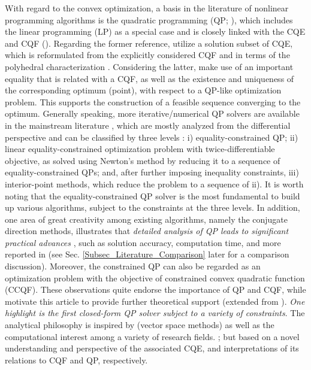 \documentclass{imaman}
\numberwithin{equation}{section}
\begin{document}
With regard to the convex optimization, a basis in the literature of nonlinear programming algorithms is the quadratic programming (QP; \cite{LiTsWo:20,Lu(Ye):03(16)}), which includes the linear programming (LP) as a special case and is closely linked with the CQE and CQF (\cite{PaSa:10,RaBoJoVeJo:08}). Regarding the former reference, \cite{PaSa:10} utilize a solution subset of CQE, which is reformulated from the explicitly considered CQF and in terms of the polyhedral characterization  \cite{Man:88}. Considering the latter,  \cite{RaBoJoVeJo:08} make use of an important equality that is related with a CQF, as well as the existence and uniqueness of the corresponding optimum (point), with respect to a QP-like optimization problem. This supports the construction of a feasible sequence converging to the optimum. Generally speaking, more iterative/numerical QP solvers are available in the mainstream literature \cite{NoWr:06}, which are mostly analyzed from the differential perspective and can be classified by three levels \cite{BoVa:04}: i) equality-constrained QP; ii) linear equality-constrained optimization problem with twice-differentiable objective, as solved using Newton's method by reducing it to a sequence of equality-constrained QPs; and, after further imposing inequality constraints, iii) interior-point methods, which reduce the problem to a sequence of ii). It is worth noting that the equality-constrained QP solver is the most fundamental to build up various algorithms, subject to the constraints at the three levels. In addition, one area of great creativity among existing algorithms, namely the conjugate direction methods, illustrates that \textit{detailed analysis of QP leads to significant practical advances}  \cite{Lu(Ye):03(16)}, such as solution accuracy, computation time, and more reported in  \cite{JoFoTo:05} (see Sec. \ref{Subsec_Literature_Comparison} later for a comparison discussion). Moreover, the constrained QP can also be regarded as an optimization problem with the objective of constrained convex quadratic function (CCQF). These observations quite endorse the importance of QP and CQF, while motivate this article to provide further theoretical support (extended from \cite{LiLiHs:20}). \textit{One highlight is the first closed-form QP solver subject to a variety of constraints}. The analytical philosophy is inspired by  \cite{Lue:69} (vector space methods) as well as the computational interest among a variety of research fields. \cite{DuJoWaWi:15,JoFo:13,Lu(Ye):03(16),RaLe:19}; but based on a novel understanding and perspective of the associated CQE, and interpretations of its relations to CQF and QP, respectively.
\end{document}
